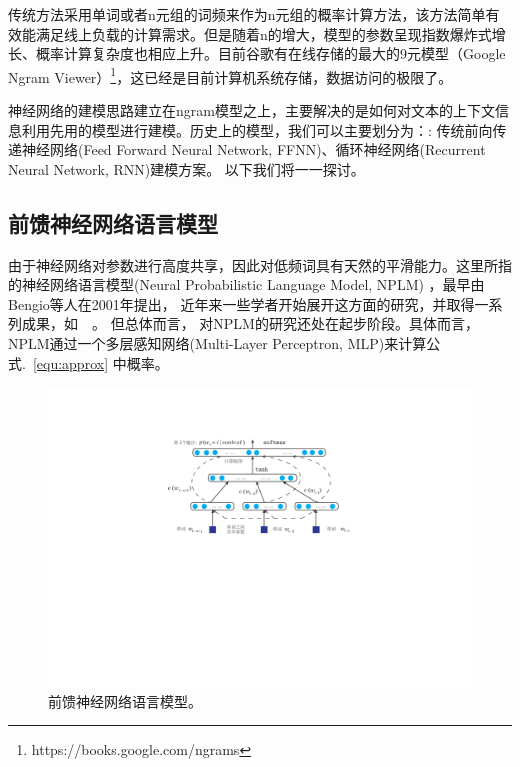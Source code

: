 传统方法采用单词或者n元组的词频来作为n元组的概率计算方法，该方法简单有效能满足线上负载的计算需求。但是随着n的增大，模型的参数呈现指数爆炸式增长、概率计算复杂度也相应上升。目前谷歌有在线存储的最大的9元模型（Google Ngram Viewer）\footnote{https://books.google.com/ngrams}，这已经是目前计算机系统存储，数据访问的极限了。


神经网络的建模思路建立在ngram模型之上，主要解决的是如何对文本的上下文信息利用先用的模型进行建模。历史上的模型，我们可以主要划分为：: 传统前向传递神经网络(Feed Forward Neural Network, FFNN)、循环神经网络(Recurrent Neural Network, RNN)建模方案。 以下我们将一一探讨。


\subsection{前馈神经网络语言模型}
由于神经网络对参数进行高度共享，因此对低频词具有天然的平滑能力。这里所指的神经网络语言模型(Neural Probabilistic Language Model, NPLM) ，最早由Bengio等人在2001年提出， 近年来一些学者开始展开这方面的研究，并取得一系列成果，如~\cite{DBLP:conf/acl/BaroniDK14,DBLP:journals/sigkdd/BellK07,DBLP:journals/pami/BengioCV13,DBLP:journals/tnn/BengioSF94}~。 但总体而言， 对NPLM的研究还处在起步阶段。具体而言，NPLM通过一个多层感知网络(Multi-Layer Perceptron, MLP)来计算公式.~\ref{equ:approx} 中概率。
\begin{figure}
  \centering
  \includegraphics[width=0.79\linewidth]{./figures/nplm.pdf}
  \caption{前馈神经网络语言模型。}\label{fig:nplm}
\end{figure}

